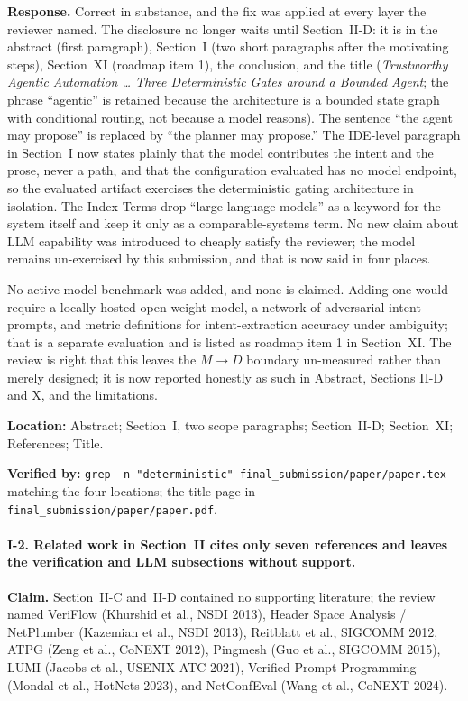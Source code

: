 \documentclass[11pt,a4paper]{article}
\begin{document}
\textbf{Response.} Correct in substance, and the fix was applied at every layer
the reviewer named. The disclosure no longer waits until Section~II-D: it is in
the abstract (first paragraph), Section~I (two short paragraphs after the
motivating steps), Section~XI (roadmap item 1), the conclusion, and the title
(\emph{Trustworthy Agentic Automation \ldots{} Three Deterministic Gates around a
Bounded Agent}; the phrase ``agentic'' is retained because the architecture is a
bounded state graph with conditional routing, not because a model reasons). The
sentence ``the agent may propose'' is replaced by ``the planner may propose.'' The
IDE-level paragraph in Section~I now states plainly that the model
contributes the intent and the prose, never a path, and that the configuration
evaluated has no model endpoint, so the evaluated artifact exercises the
deterministic gating architecture in isolation. The Index Terms drop ``large
language models'' as a keyword for the system itself and keep it only as a
comparable-systems term. No new claim about LLM capability was introduced to
cheaply satisfy the reviewer; the model remains un-exercised by this submission,
and that is now said in four places.

No active-model benchmark was added, and none is claimed. Adding one would
require a locally hosted open-weight model, a network of adversarial intent
prompts, and metric definitions for intent-extraction accuracy under ambiguity;
that is a separate evaluation and is listed as roadmap item 1 in Section~XI.
The review is right that this leaves the $M\!\rightarrow\!D$ boundary
un-measured rather than merely designed; it is now reported honestly as such
in Abstract, Sections II-D and X, and the limitations.

\textbf{Location:} Abstract; Section~I, two scope paragraphs; Section~II-D;
Section~XI; References; Title.

\textbf{Verified by:} \texttt{grep -n "deterministic" final\_submission/paper/paper.tex}
matching the four locations; the title page in
\texttt{final\_submission/paper/paper.pdf}.

\paragraph{I-2. Related work in Section~II cites only seven references and leaves
the verification and LLM subsections without support.}

\textbf{Claim.} Section~II-C and~II-D contained no supporting literature; the
review named VeriFlow (Khurshid et al., NSDI 2013), Header Space Analysis /
NetPlumber (Kazemian et al., NSDI 2013), Reitblatt et al., SIGCOMM 2012, ATPG
(Zeng et al., CoNEXT 2012), Pingmesh (Guo et al., SIGCOMM 2015), LUMI (Jacobs
et al., USENIX ATC 2021), Verified Prompt Programming (Mondal et al., HotNets
2023), and NetConfEval (Wang et al., CoNEXT 2024).
\end{document}
